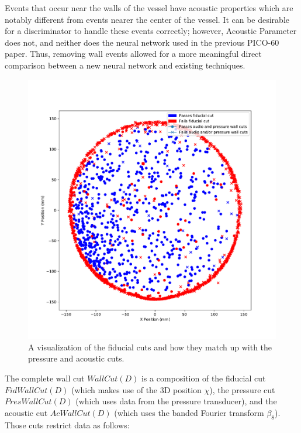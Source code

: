 \documentclass[10pt]{article}
\begin{document}
Events that occur near the walls of the vessel have acoustic properties which are notably different from events nearer the center of the vessel. It can be desirable for a discriminator to handle these events correctly; however, Acoustic Parameter does not, and neither does the neural network used in the previous PICO-60 paper. Thus, removing wall events allowed for a more meaningful direct comparison between a new neural network and existing techniques.

\begin{figure}[h!]
    \centering
    \includegraphics[width=\textwidth]{wall_event_positions}
    \caption{\label{} A visualization of the fiducial cuts and how they match up with the pressure and acoustic cuts.}
\end{figure}

The complete wall cut $WallCut(D)$ is a composition of the fiducial cut $FidWallCut(D)$ (which makes use of the 3D position $\chi$), the pressure cut $PresWallCut(D)$ (which uses data from the pressure transducer), and the acoustic cut $AcWallCut(D)$ (which uses the banded Fourier transform $\beta _{8}$). Those cuts restrict data as follows:
\end{document}
